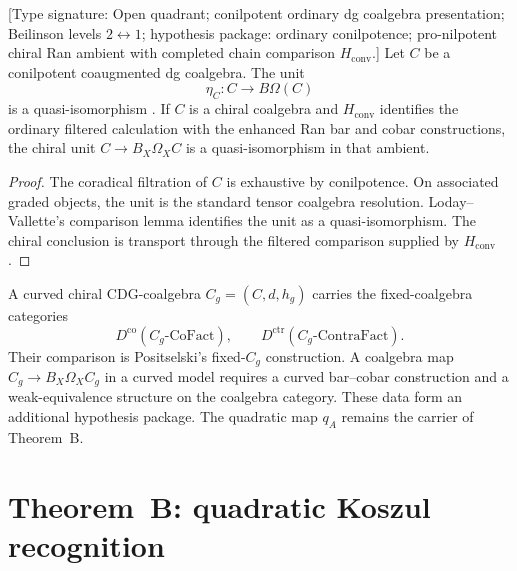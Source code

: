 \begin{theorem}
\label{thm:thm-B-coalgebra-side-unit-qi}
\textup{[Type signature: Open quadrant; conilpotent ordinary dg
coalgebra presentation; Beilinson levels \(2\leftrightarrow1\);
hypothesis package: ordinary conilpotence; pro-nilpotent chiral Ran
ambient with completed chain comparison \(H_{\mathrm{conv}}\).]}
Let \(C\) be a conilpotent coaugmented dg coalgebra.  The unit
\begin{equation}\label{eq:thm-B-coalg-unit}
 \eta_C\colon C\longrightarrow B\Omega(C)
\end{equation}
is a quasi-isomorphism
\cite[Corollary~2.3.4]{LV12}.  If \(C\) is a chiral coalgebra and
\(H_{\mathrm{conv}}\) identifies the ordinary filtered calculation
with the enhanced Ran bar and cobar constructions, the chiral unit
\(C\to B_X\Omega_XC\) is a quasi-isomorphism in that ambient.
\end{theorem}

\begin{proof}
The coradical filtration of \(C\) is exhaustive by conilpotence.
On associated graded objects, the unit is the standard tensor
coalgebra resolution.  Loday--Vallette's comparison lemma identifies
the unit as a quasi-isomorphism.  The chiral conclusion is transport
through the filtered comparison supplied by \(H_{\mathrm{conv}}\).
\end{proof}

\begin{remark}
\label{rem:thm-B-coalg-side-ambient}
A curved chiral CDG-coalgebra \(C_g=(C,d,h_g)\) carries the
fixed-coalgebra categories
\[
 D^{\mathrm{co}}(C_g\text{-}\mathrm{CoFact}),
 \qquad
 D^{\mathrm{ctr}}(C_g\text{-}\mathrm{ContraFact}).
\]
Their comparison is Positselski's fixed-\(C_g\) construction.  A coalgebra
map \(C_g\to B_X\Omega_XC_g\) in a curved model requires a curved
bar--cobar construction and a weak-equivalence structure on the
coalgebra category.  These data form an additional hypothesis
package.  The quadratic map \(q_A\) remains the carrier of
Theorem~B.
\end{remark}

\section{Theorem~B: quadratic Koszul recognition}
\label{sec:forward-references-thm-B-scope}

